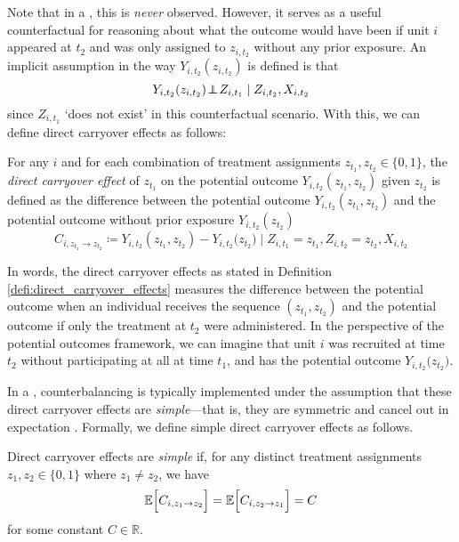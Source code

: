 Note that in a \cwsd{}, this is \emph{never} observed. However, it serves as a useful counterfactual for reasoning about what the outcome would have been if unit $i$ appeared at $t_2$ and was only assigned to $z_{i,t_2}$ without any prior exposure. An implicit assumption in the way $Y_{i,t_2}(z_{i,t_2})$ is defined is that \[Y_{i,t_2}(z_{i,t_2}) \hspace{-.2em}\perp\!\!\!\!\perp\hspace{-.2em} Z_{i,t_1} \mid Z_{i,t_2}, X_{i,t_2}\] since $Z_{i,t_1}$ `does not exist' in this counterfactual scenario. With this, we can define direct carryover effects as follows:

\begin{definition}
\label{defi:direct_carryover_effects}
For any \(i\) and for each combination of treatment assignments \(z_{t_1}, z_{t_2} \in \{0,1\}\), the \emph{direct carryover effect} of \(z_{t_1}\) on the potential outcome \(Y_{i,t_2}(z_{t_1}, z_{t_2})\) given \(z_{t_2}\) is defined as the difference between the potential outcome \(Y_{i,t_2}(z_{t_1}, z_{t_2})\) and the potential outcome without prior exposure \(Y_{i,t_2}(z_{t_2})\)
\[
C_{i, z_{t_1} \to z_{t_2}} \coloneqq Y_{i,t_2}(z_{t_1}, z_{t_2}) - Y_{i,t_2}\bigl(z_{t_2}\bigr) \mid Z_{i,t_1} = z_{t_1}, Z_{i,t_2} = z_{t_2}, X_{i,t_2}
\]
\end{definition}


In words, the direct carryover effects as stated in Definition \ref{defi:direct_carryover_effects} measures the difference between the potential outcome when an individual receives the sequence \((z_{t_1}, z_{t_2})\) and the potential outcome if only the treatment at \(t_2\) were administered. In the perspective of the potential outcomes framework, we can imagine that unit $i$ was recruited at time $t_2$ without participating at all at time $t_1$, and has the potential outcome $Y_{i,t_2}\bigl(z_{t_2}\bigr)$.

In a \cwsd{}, counterbalancing is typically implemented under the assumption that these direct carryover effects are \emph{simple}—that is, they are symmetric and cancel out in expectation \citep{02_maxwell2017designing}. Formally, we define simple direct carryover effects as follows.

\begin{assumption}
\label{assumption:simple_carryover_effects}
Direct carryover effects are \emph{simple} if, for any distinct treatment assignments \(z_1, z_2 \in \{0,1\}\) where \(z_1 \neq z_2\), we have
\[
\mathbb{E}\Bigl[C_{i, z_1 \to z_2}\Bigr] = \mathbb{E}\Bigl[C_{i, z_2 \to z_1}\Bigr] = C
\]
for some constant \(C \in \mathbb{R}\).
\end{assumption}


